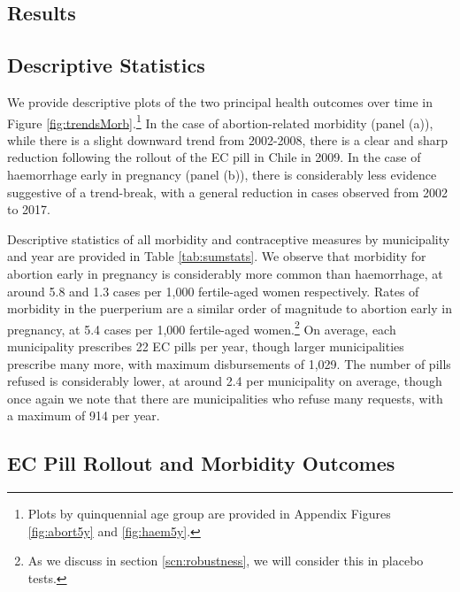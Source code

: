 \documentclass[12pt]{article}
\begin{document}
\begin{spacing}{1.9}
\section{Results}
\label{scn:results}
\subsection{Descriptive Statistics}
We provide descriptive plots of the two principal health outcomes over time in Figure
\ref{fig:trendsMorb}.\footnote{Plots by quinquennial age group are provided in Appendix
  Figures \ref{fig:abort5y} and \ref{fig:haem5y}.} In the case of abortion-related morbidity
(panel (a)), while there
is a slight downward trend from 2002-2008, there is a clear and sharp reduction following
the rollout of the EC pill in Chile in 2009.  In the case of haemorrhage early in pregnancy
(panel (b)), there is considerably less evidence suggestive of a trend-break, with a
general reduction in cases observed from 2002 to 2017.  


Descriptive statistics of all morbidity and contraceptive measures by municipality and
year are provided in Table \ref{tab:sumstats}.
We observe that morbidity for abortion early in pregnancy is considerably more common
than haemorrhage, at around 5.8 and 1.3 cases per 1,000 fertile-aged women respectively.
Rates of morbidity in the puerperium are a similar order of magnitude to abortion
early in pregnancy, at 5.4 cases per 1,000 fertile-aged women.\footnote{As we discuss
  in section \ref{scn:robustness}, we will consider this in placebo tests.} On average,
each municipality prescribes 22 EC pills per year, though larger municipalities prescribe
many more, with maximum disbursements of 1,029. The number of pills
refused is considerably lower, at around 2.4 per municipality on average, though once again
we note that there are municipalities who refuse many requests, with a maximum of 914
per year.


\subsection{EC Pill Rollout and Morbidity Outcomes}

\end{spacing}
\end{document}
